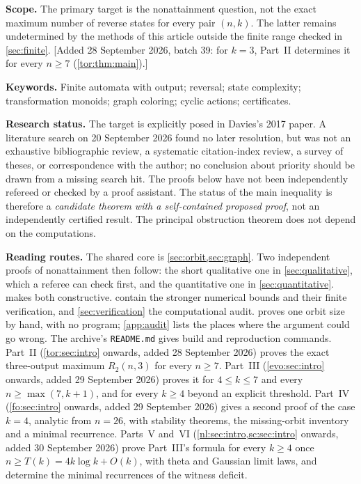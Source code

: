 \documentclass[11pt,a4paper]{article}
\numberwithin{equation}{section}
\theoremstyle{definition}
\theoremstyle{remark}
\begin{document}
\begin{titlepage}
\noindent\textbf{Scope.} The primary target is the nonattainment question,
not the exact maximum number of reverse states for every pair $(n,k)$.
The latter remains undetermined by the methods of this article outside the
finite range checked in \cref{sec:finite}.
[Added 28 September 2026, batch 39: for $k=3$, Part~II determines it for
every $n\ge7$ (\cref{tor:thm:main}).]

\vspace{0.4em}
\noindent\textbf{Keywords.} Finite automata with output; reversal; state
complexity; transformation monoids; graph coloring; cyclic actions;
certificates.
\vfill
\begin{resultbox}
\textbf{Research status.} The target is explicitly posed in Davies's 2017
paper. A literature search on 20 September 2026 found no later resolution,
but was not an exhaustive bibliographic review, a systematic citation-index
review, a survey of theses, or correspondence with the author; no conclusion
about priority should be drawn from a missing search hit. The proofs below
have not been independently refereed or checked by a proof assistant.
The status of the main inequality is therefore a \emph{candidate theorem with
a self-contained proposed proof}, not an independently certified result.
The principal obstruction theorem does not depend on the computations.
\end{resultbox}
\end{titlepage}
\hypersetup{pageanchor=true}

\tableofcontents
\vspace{7mm}
\begin{resultbox}
\textbf{Reading routes.} The shared core is
\cref{sec:orbit,sec:graph}. Two independent proofs of nonattainment then
follow: the short qualitative one in \cref{sec:qualitative}, which a referee
can check first, and the quantitative one in \cref{sec:quantitative}.
 makes both constructive.
 contain the stronger numerical bounds and
their finite verification, and \cref{sec:verification} the computational
audit.  proves one orbit size by hand, with no program;
\cref{app:audit} lists the places where the argument could go wrong.
The archive's \texttt{README.md} gives build and reproduction commands.
Part~II (\cref{tor:sec:intro} onwards, added 28 September 2026) proves the
exact three-output maximum $R_2(n,3)$ for every $n\ge7$. Part~III
(\cref{evo:sec:intro} onwards, added 29 September 2026) proves it for
$4\le k\le7$ and every $n\ge\max(7,k+1)$, and for every $k\ge4$ beyond an explicit
threshold. Part~IV (\cref{fo:sec:intro} onwards, added 29 September 2026)
gives a second proof of the case $k=4$, analytic from $n=26$, with stability
theorems, the missing-orbit inventory and a minimal recurrence.
Parts~V and~VI (\cref{nl:sec:intro,sc:sec:intro} onwards, added
30 September 2026) prove Part~III's formula for every $k\ge4$ once
$n\ge T(k)=4k\log k+O(k)$, with theta and Gaussian limit laws, and determine
the minimal recurrences of the witness deficit.
\end{resultbox}
\newpage
\end{document}
